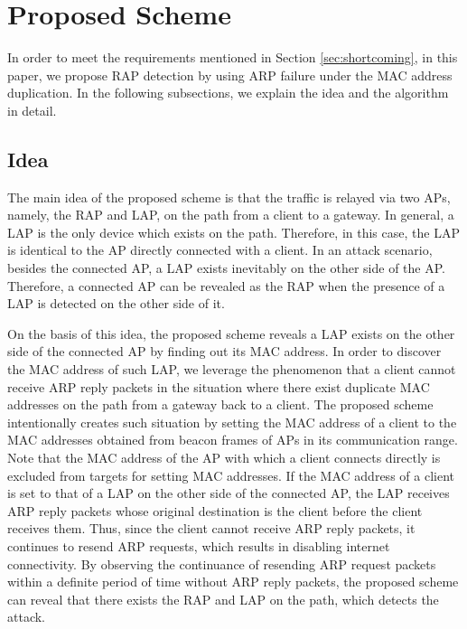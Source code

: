 \documentclass[paper]{ieice}
\begin{document}
\section{Proposed Scheme}\label{sec:4}
In order to meet the requirements mentioned in Section \ref{sec:shortcoming}, in this paper, we propose RAP detection by using ARP failure under the MAC address duplication.
In the following subsections, we explain the idea and the algorithm in detail.

\subsection{Idea}
The main idea of the proposed scheme is that the traffic is relayed via two APs, namely, the RAP and LAP, on the path from a client to a gateway.
In general, a LAP is the only device which exists on the path.
Therefore, in this case, the LAP is identical to the AP directly connected with a client.
In an attack scenario, besides the connected AP, a LAP exists inevitably on the other side of the AP.
Therefore, a connected AP can be revealed as the RAP when the presence of a LAP is detected on the other side of it.

On the basis of this idea, the proposed scheme reveals a LAP exists on the other side of the connected AP by finding out its MAC address.
In order to discover the MAC address of such LAP, we leverage the phenomenon that a client cannot receive ARP reply packets in the situation where there exist duplicate MAC addresses on the path from a gateway back to a client.
The proposed scheme intentionally creates such situation by setting the MAC address of a client to the MAC addresses obtained from beacon frames of APs in its communication range.
Note that the MAC address of the AP with which a client connects directly is excluded from targets for setting MAC addresses.
If the MAC address of a client is set to that of a LAP on the other side of the connected AP, the LAP receives ARP reply packets whose original destination is the client before the client receives them.
Thus, since the client cannot receive ARP reply packets, it continues to resend ARP requests, which results in disabling internet connectivity.
By observing the continuance of resending ARP request packets within a definite period of time without ARP reply packets, the proposed scheme can reveal that there exists the RAP and LAP on the path, which detects the attack. %
\end{document}
